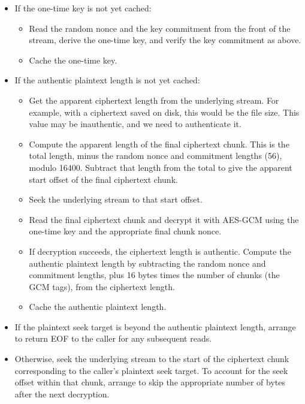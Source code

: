 \begin{itemize}
\item If the one-time key is not yet cached:
\begin{itemize}
\item Read the random nonce and the key commitment from the front of the stream, derive the one-time
key, and verify the key commitment as above.
\item Cache the one-time key.
\end{itemize}
\item If the authentic plaintext length is not yet cached:
\begin{itemize}
\item Get the apparent ciphertext length from the underlying stream. For example, with a ciphertext
saved on disk, this would be the file size. This value may be inauthentic, and we need to
authenticate it.
\item Compute the apparent length of the final ciphertext chunk. This is the total length, minus the
random nonce and commitment lengths (56), modulo 16400. Subtract that length from the total to give
the apparent start offset of the final ciphertext chunk.
\item Seek the underlying stream to that start offset.
\item Read the final ciphertext chunk and decrypt it with AES-GCM using the one-time key and the
appropriate final chunk nonce.
\item If decryption succeeds, the ciphertext length is authentic. Compute the authentic plaintext
length by subtracting the random nonce and commitment lengths, plus 16 bytes times the number of
chunks (the GCM tags), from the ciphertext length.
\item Cache the authentic plaintext length.
\end{itemize}
\item If the plaintext seek target is beyond the authentic plaintext length, arrange to return EOF
to the caller for any subsequent reads.
\item Otherwise, seek the underlying stream to the start of the ciphertext chunk corresponding to
the caller's plaintext seek target. To account for the seek offset within that chunk, arrange to
skip the appropriate number of bytes after the next decryption.
\end{itemize}
